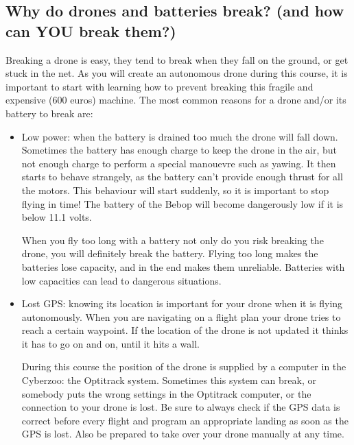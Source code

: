 \documentclass{article}
\begin{document}
\subsection*{Why do drones and batteries break? (and how can YOU break them?)}
Breaking a drone is easy, they tend to break when they fall on the ground, or get stuck in the net. As you will create an autonomous drone during this course, it is important to start with learning how to prevent breaking this fragile and expensive (600 euros) machine. The most common reasons for a drone and/or its battery to break are:
\begin{itemize}
\item Low power: when the battery is drained too much the drone will fall down. Sometimes the battery has enough charge to keep the drone in the air, but not enough charge to perform a special manouevre such as yawing. It then starts to behave strangely, as the battery can't provide enough thrust for all the motors. This behaviour will start suddenly, so it is important to stop flying in time! The battery of the Bebop will become dangerously low if it is below 11.1 volts.  

When you fly too long with a battery not only do you risk breaking the drone, you will definitely break the battery. Flying too long makes the batteries lose capacity, and in the end makes them unreliable. Batteries with low capacities can lead to dangerous situations. 
\item Lost GPS: knowing its location is important for your drone when it is flying autonomously. When you are navigating on a flight plan your drone tries to reach a certain waypoint. If the location of the drone is not updated it thinks it has to go on and on, until it hits a wall. 

During this course the position of the drone is supplied by a computer in the Cyberzoo: the Optitrack system. Sometimes this system can break, or somebody puts the wrong settings in the Optitrack computer, or the connection to your drone is lost. Be sure to always check if the GPS data is correct before every flight and program an appropriate landing as soon as the GPS is lost. Also be prepared to take over your drone manually at any time. 


\end{itemize}
\end{document}
